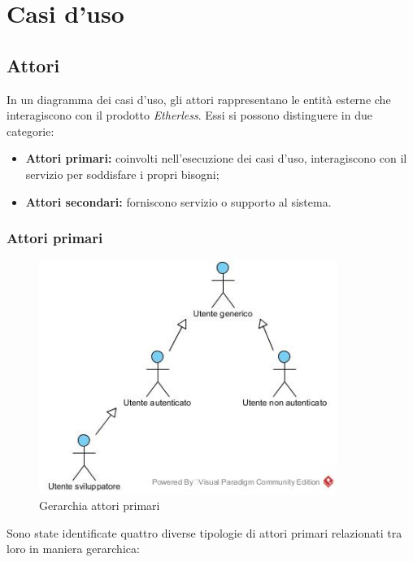 \section{Casi d'uso}

\subsection{Attori}
In un diagramma dei casi d'uso, gli attori rappresentano le entità esterne che interagiscono con il prodotto \textit{Etherless}. Essi si possono distinguere in due categorie:
\begin{itemize}
	\item \textbf{Attori primari:} coinvolti nell'esecuzione dei casi d'uso, interagiscono con il servizio per soddisfare i propri bisogni;
	\item \textbf{Attori secondari:} forniscono servizio o supporto al sistema. 
\end{itemize}

\subsubsection{Attori primari}
\begin{figure}[h]
	\centering
	\includegraphics[width=9.7cm]{res/img/gerarchiaAttoriPrimari.jpg}
	\caption{Gerarchia attori primari}
\end{figure}

Sono state identificate quattro diverse tipologie di attori primari relazionati tra loro in maniera gerarchica:

